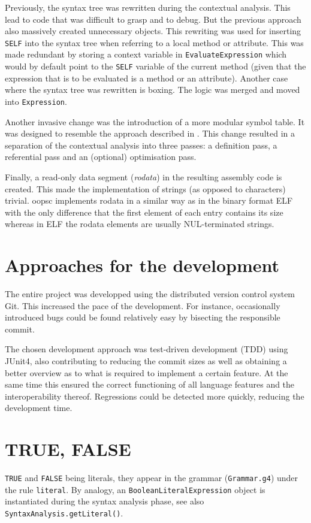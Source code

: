 \documentclass{guide}
\begin{document}
	Previously, the syntax tree was rewritten during the contextual analysis. This
	lead to code that was difficult to grasp and to debug. But the previous
	approach also massively created unnecessary objects. This rewriting was used
	for inserting \texttt{SELF} into the syntax tree when referring to a local method or
	attribute. This was made redundant by storing a context variable in
	\texttt{EvaluateExpression} which would by default point to the \texttt{SELF} variable
	of the current method (given that the expression that is to be evaluated is a
	method or an attribute). Another case where the syntax tree was rewritten is
	boxing. The logic was merged and moved into \texttt{Expression}.

	Another invasive change was the introduction of a more modular symbol table. It
	was designed to resemble the approach described in
	\cite[p.~182ff]{Parr:2009:LIP:1823613}. This change resulted in a separation of
	the contextual analysis into three passes: a definition pass, a referential
	pass and an (optional) optimisation pass.

	Finally, a read-only data segment (\textit{rodata}) in the resulting assembly code is
	created. This made the implementation of strings (as opposed to characters)
	trivial. oopsc implements rodata in a similar way as in the binary format ELF
	with the only difference that the first element of each entry contains its size
	whereas in ELF the rodata elements are usually NUL-terminated strings.

	\section{Approaches for the development}
	The entire project was developped using the distributed version control system
	Git. This increased the pace of the development. For instance, occasionally
	introduced bugs could be found relatively easy by bisecting the responsible
	commit.

	The chosen development approach was test-driven development (TDD) using JUnit4,
	also contributing to reducing the commit sizes as well as obtaining a better
	overview as to what is required to implement a certain feature. At the same
	time this ensured the correct functioning of all language features and the
	interoperability thereof. Regressions could be detected more quickly, reducing
	the development time.

	\section{TRUE, FALSE}
	\texttt{TRUE} and \texttt{FALSE} being literals, they appear in the grammar
	(\texttt{Grammar.g4}) under the rule \texttt{literal}. By analogy, an
	\texttt{BooleanLiteralExpression} object is instantiated during the
	syntax analysis phase, see also \texttt{SyntaxAnalysis.getLiteral()}.
\end{document}
